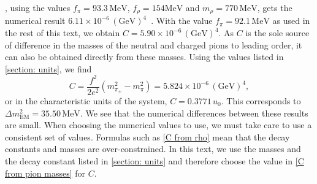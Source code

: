 %
\citeauthor{urechVirtualPhotonsChiral1995}, using the values $f_\pi = 93.3\, \text{MeV}$, $f_\rho = 154 \text{MeV}$ and $m_\rho = 770\, \text{MeV}$, gets the numerical result $6.11\times 10^{-6} \, (\text{GeV})^4$~\autocite{urechVirtualPhotonsChiral1995}.
With the value $f_\pi = 92.1\,\text{MeV}$ as used in the rest of this text, we obtain $C = 5.90\times 10^{-6} \, (\text{GeV})^4$.
As $C$ is the sole source of difference in the masses of the neutral and charged pions to leading order, it can also be obtained directly from these masses.
Using the values listed in \autoref{section: units}, we find
%
\begin{equation}
    \label{C from pion masses}
    C= \frac{f^2}{2 e^2}(m_{\pi_\pm}^2 - m_{\pi}^2) = 5.824 \times 10^{-6} \, (\text{GeV})^4 ,
\end{equation}
%
or in the characteristic units of the system, $C = 0.3771 \, u_0$.
This corresponds to $\Delta m_\text{EM}^2 = 35.50 \, \text{MeV}$.
We see that the numerical differences between these results are small.
When choosing the numerical values to use, we must take care to use a consistent set of values.
Formulas such as \autoref{C from rho} mean that the decay constants and masses are over-constrained.
In this text, we use the masses and the decay constant listed in \autoref{section: units} and therefore choose the value in \autoref{C from pion masses} for $C$.

